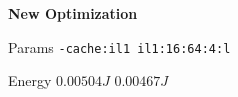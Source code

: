 
        \begin{tcolorbox}[width=\linewidth, colback=white!95!black, colframe=white!95!black]
            \begin{center}\textbf{New Optimization}\end{center}

            \tcblower
            
            Params \hfill \verb|-cache:il1 il1:16:64:4:l|

            Energy \hfill \st{$0.00504J$} $0.00467J$

        \end{tcolorbox}
    